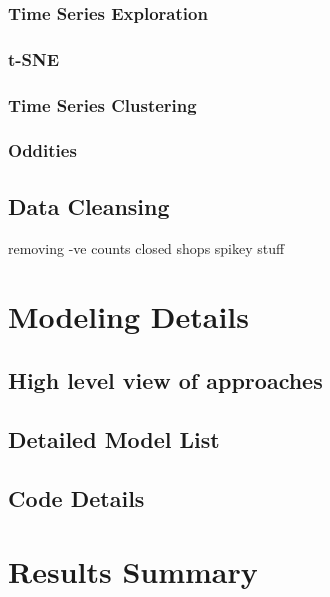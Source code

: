 \documentclass[floatsintext,man]{apa6}
\theoremstyle{definition}
\theoremstyle{definition}
\theoremstyle{definition}
\theoremstyle{remark}
\begin{document}
\subsubsection{Time Series Exploration}\label{time-series-exploration}

\subsubsection{t-SNE}\label{t-sne}

\subsubsection{Time Series Clustering}\label{time-series-clustering}

\subsubsection{Oddities}\label{oddities}

\subsection{Data Cleansing}\label{data-cleansing}

removing -ve counts closed shops spikey stuff

\section{Modeling Details}\label{modeling-details}

\subsection{High level view of
approaches}\label{high-level-view-of-approaches}

\subsection{Detailed Model List}\label{detailed-model-list}

\subsection{Code Details}\label{code-details}

\section{Results Summary}\label{results-summary}
\end{document}
